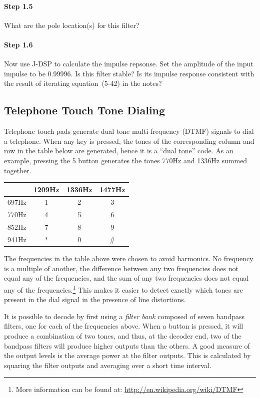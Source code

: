 \paragraph{Step 1.5} What are the pole location(s) for this filter?


\paragraph{Step 1.6} Now use J-DSP to calculate the impulse repsonse.
Set the amplitude of the input impulse to be 0.99996. Is this filter stable? 
Is its impulse response consistent with the result of iterating equation~(5-42) in the notes?


\subsection{Telephone Touch Tone Dialing}
Telephone touch pads generate dual tone multi frequency (DTMF) signals
to dial a telephone. When any key is pressed, the tones of the
corresponding column and row in the table below are generated, hence
it is a ``dual tone'' code. As an example, pressing the 5 button
generates the tones 770Hz and 1336Hz summed together.

\begin{center}
  \begin{tabular}{l|ccc}
    & 1209Hz & 1336Hz & 1477Hz \\ \hline
    697Hz &   1    &   2    &   3    \\
    770Hz &   4    &   5    &   6    \\
    852Hz &   7    &   8    &   9    \\
    941Hz &   $\ast $    &   0    &   \#    
  \end{tabular}
\end{center}

The frequencies in the table above were chosen to avoid harmonics. No
frequency is a multiple of another, the difference between any two
frequencies does not equal any of the frequencies, and the sum of any
two frequencies does not equal any of the frequencies.\footnote{More
  information can be found at:
  \url{http://en.wikipedia.org/wiki/DTMF}} This makes it easier to
detect exactly which tones are present in the dial signal in the
presence of line distortions.

It is possible to decode by first using a \emph{filter bank} composed
of seven bandpass filters, one for each of the frequencies
above. When a button is pressed, it will produce a combination of two
tones, and thus, at the decoder end, two of the bandpass filters will
produce higher outputs than the others. A good measure of the output
levels is the average power at the filter outputs. This is calculated
by squaring the filter outputs and averaging over a short time
interval.

